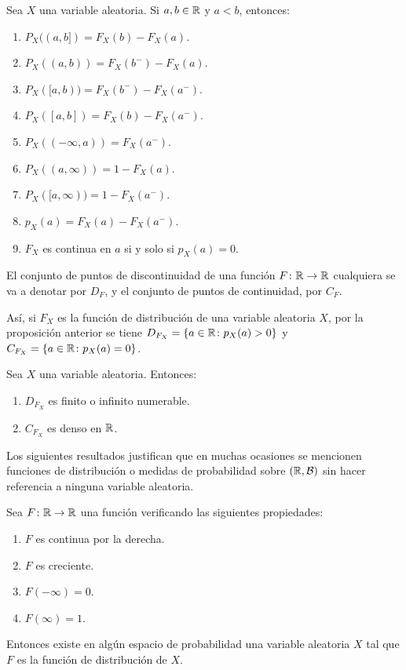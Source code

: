 \documentclass[a4paper, 11pt, extrafontsizes]{memoir}
\begin{document}
\begin{proposition}
    Sea $X$ una variable aleatoria. Si $a,b \in \mathbb R$ y $a<b$, entonces:
    \begin{enumerate}
        \item $P_X((a,b]) = F_X(b)-F_X(a)$.
        \item $P_X((a,b)) = F_X(b^-)-F_X(a)$.
        \item $P_X([a,b)) = F_X(b^-)-F_X(a^-)$.
        \item $P_X([a,b]) = F_X(b)-F_X(a^-)$.
        \item $P_X((-\infty,a)) = F_X(a^-)$.
        \item $P_X((a,\infty)) = 1-F_X(a)$.
        \item $P_X([a,\infty)) = 1-F_X(a^-)$.
        \item $p_X(a) = F_X(a)-F_X(a^-)$.
        \item $F_X$ es continua en $a$ si y solo si $p_X(a) = 0$.
    \end{enumerate}
\end{proposition}

El conjunto de puntos de discontinuidad de una función $F \colon \mathbb R \to \mathbb R$ cualquiera se va a denotar por $D_F$, y el conjunto de puntos de continuidad, por $C_F$. 

Así, si $F_X$ es la función de distribución de una variable aleatoria $X$, por la proposición anterior se tiene $D_{F_X} = \{a \in \mathbb R \colon p_X(a)>0\}$ y $C_{F_X} = \{a \in \mathbb R \colon p_X(a)=0\}$.

\begin{proposition}
    Sea $X$ una variable aleatoria. Entonces:
    \begin{enumerate}
        \item $D_{F_X}$ es finito o infinito numerable.
        \item $C_{F_X}$ es denso en $\mathbb R$.
    \end{enumerate}
\end{proposition}

Los siguientes resultados justifican que en muchas ocasiones se mencionen funciones de distribución o medidas de probabilidad sobre $(\mathbb R,\mathcal{B})$ sin hacer referencia a ninguna variable aleatoria.

\begin{theorem}\label{teo:1.2.8}
    Sea $F \colon \mathbb R \to \mathbb R$ una función verificando las siguientes propiedades:
    \begin{enumerate}
        \item $F$ es continua por la derecha.
        \item $F$ es creciente.
        \item $F(-\infty) = 0$.
        \item $F(\infty) = 1$.
    \end{enumerate}
    Entonces existe en algún espacio de probabilidad una variable aleatoria $X$ tal que $F$ es la función de distribución de $X$.
\end{theorem}
\end{document}
